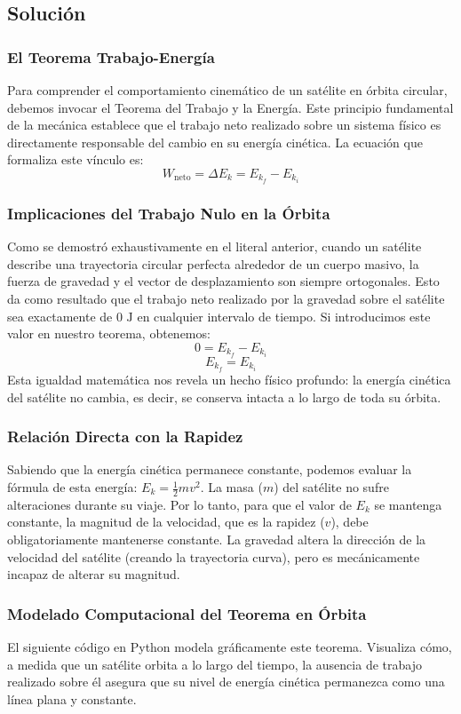 \documentclass[a4paper,12pt]{article}
\begin{document}
\subsection*{Solución}

\subsubsection*{El Teorema Trabajo-Energía}
Para comprender el comportamiento cinemático de un satélite en órbita circular, debemos invocar el Teorema del Trabajo y la Energía. Este principio fundamental de la mecánica establece que el trabajo neto realizado sobre un sistema físico es directamente responsable del cambio en su energía cinética. La ecuación que formaliza este vínculo es:
$$W_{\text{neto}} = \Delta E_k = E_{k_f} - E_{k_i}$$

\subsubsection*{Implicaciones del Trabajo Nulo en la Órbita}
Como se demostró exhaustivamente en el literal anterior, cuando un satélite describe una trayectoria circular perfecta alrededor de un cuerpo masivo, la fuerza de gravedad y el vector de desplazamiento son siempre ortogonales. Esto da como resultado que el trabajo neto realizado por la gravedad sobre el satélite sea exactamente de $0\text{ J}$ en cualquier intervalo de tiempo.
Si introducimos este valor en nuestro teorema, obtenemos:
$$0 = E_{k_f} - E_{k_i}$$
$$E_{k_f} = E_{k_i}$$
Esta igualdad matemática nos revela un hecho físico profundo: la energía cinética del satélite no cambia, es decir, se conserva intacta a lo largo de toda su órbita.

\subsubsection*{Relación Directa con la Rapidez}
Sabiendo que la energía cinética permanece constante, podemos evaluar la fórmula de esta energía: $E_k = \frac{1}{2} m v^2$. La masa ($m$) del satélite no sufre alteraciones durante su viaje. Por lo tanto, para que el valor de $E_k$ se mantenga constante, la magnitud de la velocidad, que es la rapidez ($v$), debe obligatoriamente mantenerse constante. La gravedad altera la dirección de la velocidad del satélite (creando la trayectoria curva), pero es mecánicamente incapaz de alterar su magnitud.

\subsubsection*{Modelado Computacional del Teorema en Órbita}
El siguiente código en Python modela gráficamente este teorema. Visualiza cómo, a medida que un satélite orbita a lo largo del tiempo, la ausencia de trabajo realizado sobre él asegura que su nivel de energía cinética permanezca como una línea plana y constante.
\end{document}
